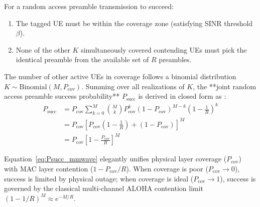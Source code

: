 For a random access preamble transmission to succeed:
\begin{enumerate}
    \item The tagged UE must be within the coverage zone (satisfying SINR threshold $\beta$).
    \item None of the other $K$ simultaneously covered contending UEs must pick the identical preamble from the available set of $R$ preambles.
\end{enumerate}
The number of other active UEs in coverage follows a binomial distribution $K \sim \mathrm{Binomial}(M, P_{\mathrm{cov}})$. Summing over all realizations of $K$, the **joint random access preamble success probability** $P_{\mathrm{succ}}$ is derived in closed form as \cite{bommisetty2022mmwave}:
\begin{align}
    \label{eq:Psucc_mmwave}
    P_{\mathrm{succ}} &= P_{\mathrm{cov}} \sum_{k=0}^M \binom{M}{k} P_{\mathrm{cov}}^k (1 - P_{\mathrm{cov}})^{M-k} \left( 1 - \frac{1}{R} \right)^k \nonumber \\
    &= P_{\mathrm{cov}} \left[ P_{\mathrm{cov}} \left( 1 - \frac{1}{R} \right) + (1 - P_{\mathrm{cov}}) \right]^M \nonumber \\
    &= P_{\mathrm{cov}} \left[ 1 - \frac{P_{\mathrm{cov}}}{R} \right]^M
\end{align}

Equation~\eqref{eq:Psucc_mmwave} elegantly unifies physical layer coverage ($P_{\mathrm{cov}}$) with MAC layer contention ($1 - P_{\mathrm{cov}}/R$). When coverage is poor ($P_{\mathrm{cov}} \to 0$), success is limited by physical outage; when coverage is ideal ($P_{\mathrm{cov}} \to 1$), success is governed by the classical multi-channel ALOHA contention limit $(1 - 1/R)^M \approx e^{-M/R}$.

